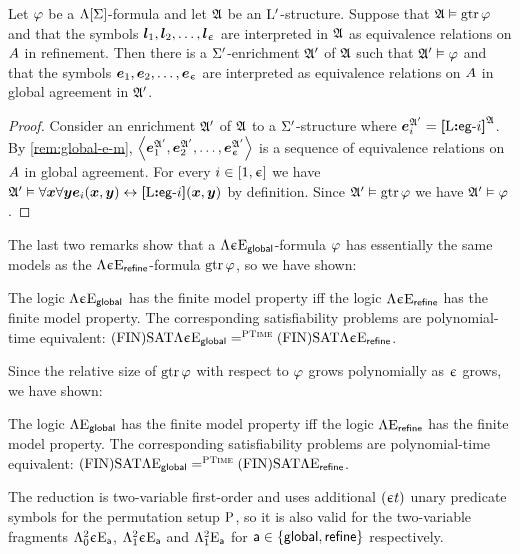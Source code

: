\begin{remark}\label{rem:global-m-to-e}
Let $\varphi$ be a $\Lambda[\mathrm{\Sigma}]$-formula and let $\mathfrak{A}$ be an
${\mathrm{L}'}$-structure.
Suppose that $\mathfrak{A} \vDash \operatorname{gtr}\varphi$ and that the symbols
$\bm{l}_{1},\bm{l}_{2},\dots,\bm{l}_{\upepsilon}$ are interpreted in $\mathfrak{A}$ as equivalence
relations on $A$ in refinement.
Then there is a $\mathrm{\Sigma'}$-enrichment $\mathfrak{A'}$ of $\mathfrak{A}$ such that
$\mathfrak{A'} \vDash \varphi$ and that the symbols $\bm{e}_{1},\bm{e}_{2},\dots,\bm{e}_{\upepsilon}$ are
interpreted as equivalence relations on $A$ in global agreement in $\mathfrak{A'}$.
\end{remark}
\begin{proof}
Consider an enrichment $\mathfrak{A'}$ of $\mathfrak{A}$ to a $\mathrm{\Sigma'}$-structure
where $\bm{e}_{i}^{\mathfrak{A'}} = {\bm{[}\mathrm{L}\mathord{\bm{:}}\mathsf{eg}{\hbox{-}}i\bm{]}}^{\mathfrak{A}}$.
By \cref{rem:global-e-m},
$\left\langle \bm{e}_{1}^{\mathfrak{A'}}, \bm{e}_{2}^{\mathfrak{A'}}, \dots, \bm{e}_{\upepsilon}^{\mathfrak{A'}} \right\rangle$
is a sequence of equivalence relations on $A$ in global agreement.
For every $i \in [1,\upepsilon]$ we have 
$\mathfrak{A'} \vDash \forall\bm{x}\forall\bm{y} \bm{e}_{i}(\bm{x},\bm{y}) \leftrightarrow {\bm{[}\mathrm{L}\mathord{\bm{:}}\mathsf{eg}{\hbox{-}}i\bm{]}}(\bm{x},\bm{y})$
by definition.
Since $\mathfrak{A'} \vDash \operatorname{gtr}\varphi$ we have $\mathfrak{A'} \vDash \varphi$.
\end{proof}

The last two remarks show that a $\Lambda{\upepsilon}\mathrm{E}_{\mathsf{global}}$-formula $\varphi$
has essentially the same models as the $\Lambda{\upepsilon}\mathrm{E}_{\mathsf{refine}}$-formula
$\operatorname{gtr}\varphi$, so we have shown:
\begin{proposition}\label{prop:global-to-refine-n}
The logic $\Lambda{\upepsilon}\mathrm{E}_{\mathsf{global}}$ has the finite model property iff
the logic $\Lambda{\upepsilon}\mathrm{E}_{\mathsf{refine}}$ has the finite model property. 
The corresponding satisfiability problems are polynomial-time equivalent:
$\mathrm{(FIN)SAT}\Lambda{\upepsilon}\mathrm{E}_{\mathsf{global}} =^{\text{\normalfont{\scshape PTime}}} \mathrm{(FIN)SAT}\Lambda{\upepsilon}\mathrm{E}_{\mathsf{refine}}$.
\end{proposition}

Since the relative size of $\operatorname{gtr}\varphi$ with respect to $\varphi$ grows
polynomially as $\upepsilon$ grows, we have shown:
\begin{proposition}\label{prop:global-to-refine}
The logic $\Lambda{{}}\mathrm{E}_{\mathsf{global}}$ has the finite model property iff
the logic $\Lambda{{}}\mathrm{E}_{\mathsf{refine}}$ has the finite model property. 
The corresponding satisfiability problems are polynomial-time equivalent:
$\mathrm{(FIN)SAT}\Lambda{{}}\mathrm{E}_{\mathsf{global}} =^{\text{\normalfont{\scshape PTime}}} \mathrm{(FIN)SAT}\Lambda{{}}\mathrm{E}_{\mathsf{refine}}$.
\end{proposition}

The reduction is two-variable first-order and uses additional $(\upepsilon t)$
unary predicate symbols for the permutation setup $\mathrm{P}$, so it is also valid
for the two-variable fragments $\Lambda^{2}_{0}{\upepsilon}\mathrm{E}_{\mathsf{a}}$, $\Lambda^{2}_{1}{\upepsilon}\mathrm{E}_{\mathsf{a}}$
and $\Lambda^{2}_{1}{{}}\mathrm{E}_{\mathsf{a}}$ for $\mathsf{a} \in \left\{\mathsf{global}, \mathsf{refine}\right\}$
respectively.
